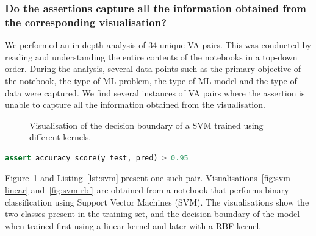 \subsubsection{Do the assertions capture all the information obtained from the corresponding visualisation?}
We performed an in-depth analysis of 34 unique VA pairs. This was conducted by reading and understanding the entire contents of the notebooks in a top-down order. During the analysis, several data points such as the primary objective of the notebook, the type of ML problem, the type of ML model and the type of data were captured. We find several instances of VA pairs where the assertion is unable to capture all the information obtained from the visualisation.

\begin{figure}
  \hfill
  \caption{Visualisation of the decision boundary of a SVM trained using different kernels.}\label{fig:svm}
\end{figure}

\begin{lstlisting}[language=Python, caption={Assertion on the accuracy of the ML model.}, label={lst:svm}]
assert accuracy_score(y_test, pred) > 0.95
\end{lstlisting}

Figure~\ref{fig:svm} and Listing~\ref{lst:svm} present one such pair. Visualisations~\ref{fig:svm-linear} and~\ref{fig:svm-rbf} are obtained from a notebook that performs binary classification using Support Vector Machines (SVM). The visualisations show the two classes present in the training set, and the decision boundary of the model when trained first using a linear kernel and later with a RBF kernel.

